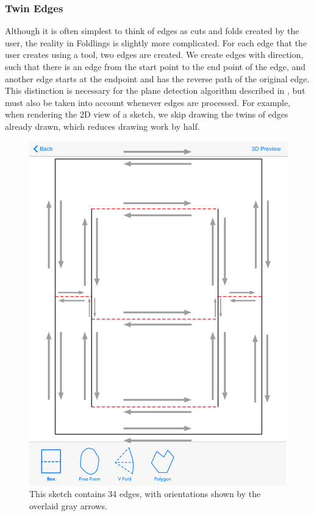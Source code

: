 \subsubsection{Twin Edges}\label{twin-edges}

Although it is often simplest to think of edges as cuts and folds
created by the user, the reality in Foldlings is slightly more
complicated. For each edge that the user creates using a tool, two edges
are created. We create edges with direction, such that there is an edge
from the start point to the end point of the edge, and another edge
starts at the endpoint and has the reverse path of the original edge.
This distinction is necessary for the plane detection algorithm
described in \citet{mallen}, but must also be taken into account
whenever edges are processed. For example, when rendering the 2D view of
a sketch, we skip drawing the twins of edges already drawn, which
reduces drawing work by half.

\begin{figure}[htbp]
\centering
\includegraphics{figures/33_UI_Interface_Data_Structures/boxfold_34_edges.png}
\caption{This sketch contains 34 edges, with orientations shown by the
overlaid gray arrows.}
\end{figure}

